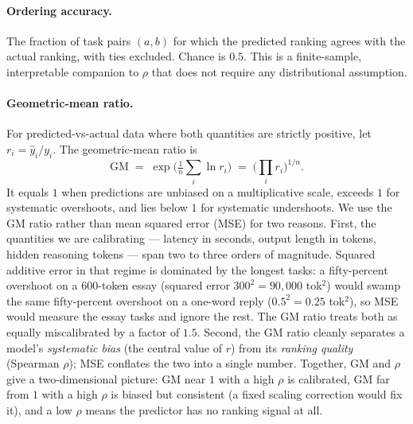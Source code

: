\documentclass[11pt]{article}
\begin{document}
\paragraph{Ordering accuracy.} The fraction of task pairs $(a, b)$ for which the predicted
ranking agrees with the actual ranking, with ties excluded. Chance is $0.5$. This is a
finite-sample, interpretable companion to $\rho$ that does not require any distributional
assumption.

\paragraph{Geometric-mean ratio.} For predicted-vs-actual data where both quantities are
strictly positive, let $r_i = \hat{y}_i / y_i$. The geometric-mean ratio is
\[
\mathrm{GM} \;=\; \exp\!\Big(\tfrac{1}{n}\sum_i \ln r_i\Big)
            \;=\; \Big(\textstyle\prod_i r_i\Big)^{1/n}.
\]
It equals $1$ when predictions are unbiased on a multiplicative scale, exceeds $1$ for
systematic overshoots, and lies below $1$ for systematic undershoots. We use the GM ratio
rather than mean squared error (MSE) for two reasons. First, the quantities we are calibrating
--- latency in seconds, output length in tokens, hidden reasoning tokens --- span two to three
orders of magnitude. Squared additive error in that regime is dominated by the longest tasks:
a fifty-percent overshoot on a 600-token essay (squared error $300^2 = 90{,}000$ tok$^2$) would
swamp the same fifty-percent overshoot on a one-word reply ($0.5^2 = 0.25$ tok$^2$), so MSE
would measure the essay tasks and ignore the rest. The GM ratio treats both as equally
miscalibrated by a factor of $1.5$. Second, the GM ratio cleanly separates a model's
\emph{systematic bias} (the central value of $r$) from its \emph{ranking quality} (Spearman
$\rho$); MSE conflates the two into a single number. Together, $\mathrm{GM}$ and $\rho$ give a
two-dimensional picture: GM near $1$ with a high $\rho$ is calibrated, GM far from $1$ with a
high $\rho$ is biased but consistent (a fixed scaling correction would fix it), and a low
$\rho$ means the predictor has no ranking signal at all.
\end{document}
